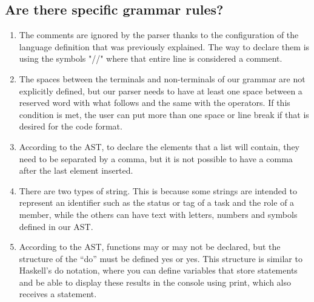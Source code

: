 \documentclass{article}
\begin{document}
\subsection*{Are there specific grammar rules?}
\begin{enumerate}
    \item The comments are ignored by the parser thanks to the configuration of the language definition that was previously explained. The way to declare them is using the symbols "//" where that entire line is considered a comment.

    \item The spaces between the terminals and non-terminals of our grammar are not explicitly defined, but our parser needs to have at least one space between a reserved word with what follows and the same with the operators. If this condition is met, the user can put more than one space or line break if that is desired for the code format.

    \item According to the AST, to declare the elements that a list will contain, they need to be separated by a comma, but it is not possible to have a comma after the last element inserted.

    \item There are two types of string. This is because some strings are intended to represent an identifier such as the status or tag of a task and the role of a member, while the others can have text with letters, numbers and symbols defined in our AST.

    \item According to the AST, functions may or may not be declared, but the structure of the ``do'' must be defined yes or yes. This structure is similar to Haskell's do notation, where you can define variables that store statements and be able to display these results in the console using print, which also receives a statement.
\end{enumerate}
\end{document}
